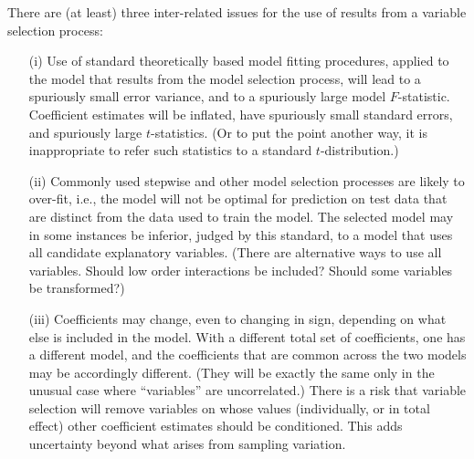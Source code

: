 \documentclass{tufte-book}\usepackage[]{graphicx}\usepackage[]{color}
\begin{document}
There are (at least) three inter-related issues for the use of results
from a variable selection process:
\begin{enumerate}
\item[(i)] Use of standard theoretically based model fitting procedures,
  applied to the model that results from the model selection process,
  will lead to a spuriously small error variance, and to a spuriously
  large model $F$-statistic.  Coefficient estimates will be inflated,
  have spuriously small standard errors, and spuriously large
  $t$-statistics.  (Or to put the point another way, it is inappropriate
  to refer such statistics to a standard $t$-distribution.)
\item[(ii)] Commonly used stepwise and other model selection processes
  are likely to over-fit, i.e., the model will not be optimal for
  prediction on test data that are distinct from the data used to
  train the model.  The selected model may in some instances be
  inferior, judged by this standard, to a model that uses all candidate
  explanatory variables. (There are alternative ways to use all variables.
  Should low order interactions be included?  Should some variables be
  transformed?)
\item[(iii)] Coefficients may change, even to changing in sign, depending
  on what else is included in the model. With a different total set of
  coefficients, one has a different model, and the coefficients that
  are common across the two models may be accordingly different.
  (They will be exactly the same only in the unusual case where
  ``variables'' are uncorrelated.)  There is a risk that variable
  selection will remove variables on whose values (individually, or in
  total effect) other coefficient estimates should be conditioned.
  This adds uncertainty beyond what arises from sampling variation.
  \label{item:coef}
\end{enumerate}
\end{document}
